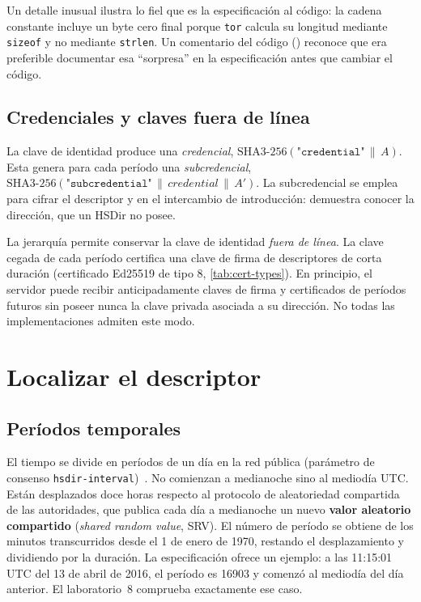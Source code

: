 Un detalle inusual ilustra lo fiel que es la especificación al código: la cadena constante incluye un byte cero final porque \texttt{tor} calcula su longitud mediante \texttt{sizeof} y no mediante \texttt{strlen}. Un comentario del código () reconoce que era preferible documentar esa \enquote{sorpresa} en la especificación antes que cambiar el código.

\subsection{Credenciales y claves fuera de línea}

La clave de identidad produce una \emph{credencial}, $\mathrm{SHA3\text{-}256}(\texttt{"credential"} \,\|\, A)$. Esta genera para cada período una \emph{subcredencial}, $\mathrm{SHA3\text{-}256}(\texttt{"subcredential"} \,\|\, \mathit{credential} \,\|\, A')$. La subcredencial se emplea para cifrar el descriptor y en el intercambio de introducción: demuestra conocer la dirección, que un HSDir no posee.

La jerarquía permite conservar la clave de identidad \emph{fuera de línea}. La clave cegada de cada período certifica una clave de firma de descriptores de corta duración (certificado Ed25519 de tipo 8, \cref{tab:cert-types}). En principio, el servidor puede recibir anticipadamente claves de firma y certificados de períodos futuros sin poseer nunca la clave privada asociada a su dirección. No todas las implementaciones admiten este modo.

\section{Localizar el descriptor}\label{sec:os-hsdir}

\subsection{Períodos temporales}

El tiempo se divide en períodos de un día en la red pública (parámetro de consenso \texttt{hsdir-interval})~. No comienzan a medianoche sino al mediodía UTC. Están desplazados doce horas respecto al protocolo de aleatoriedad compartida de las autoridades, que publica cada día a medianoche un nuevo \textbf{valor aleatorio compartido} (\emph{shared random value}, SRV). El número de período se obtiene de los minutos transcurridos desde el 1 de enero de 1970, restando el desplazamiento y dividiendo por la duración. La especificación ofrece un ejemplo: a las 11:15:01 UTC del 13 de abril de 2016, el período es 16903 y comenzó al mediodía del día anterior. El laboratorio~8 comprueba exactamente ese caso.

